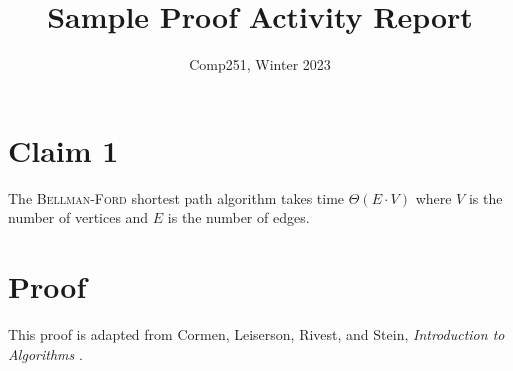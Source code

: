 \documentclass[12pt]{article}
\title{Sample Proof Activity Report}
\author{}
\date{Comp251, Winter 2023}
\begin{document}
\maketitle

\section*{Claim 1}
The \textsc{Bellman-Ford} shortest path algorithm takes time $\Theta(E\cdot V)$ where $V$ is the number of vertices and $E$ is the number of edges.

\section*{Proof}
This proof is adapted from Cormen, Leiserson, Rivest, and Stein, \textit{Introduction to Algorithms} \cite{cormen2009introduction}.
\end{document}
